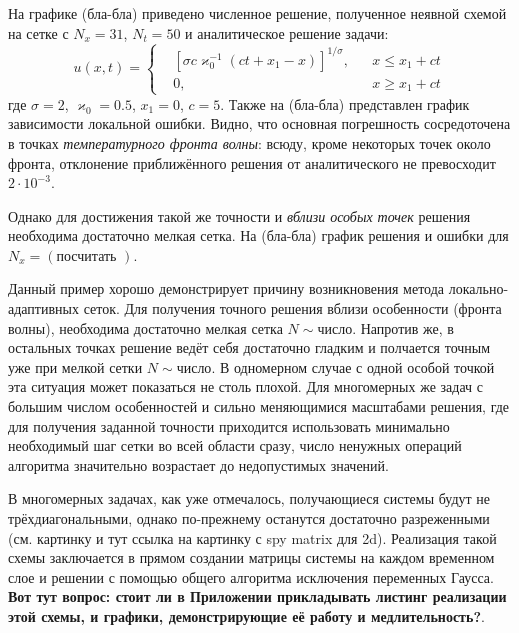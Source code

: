 На графике (бла-бла) приведено численное решение, полученное неявной схемой на сетке с $N_x = 31$, $N_t = 50$ и аналитическое решение задачи:
\begin{equation*}
    u(x, t) = \left\{
        \begin{aligned}
            &\left[ \sigma c\varkappa_0^{-1} (ct + x_1 - x) \right]^{1/\sigma}, && x \le x_1 + ct\\
            &0, && x \ge x_1 + ct
        \end{aligned}
    \right.
\end{equation*}
где $\sigma = 2$, $\varkappa_0 = 0.5$, $x_1 = 0$, $c = 5$. 
Также на (бла-бла) представлен график зависимости локальной ошибки.
Видно, что основная погрешность сосредоточена в точках \emph{температурного фронта волны}: всюду, кроме некоторых точек около фронта, отклонение приближённого решения от аналитического не превосходит $2\cdot 10^{-3}$.

Однако для достижения такой же точности и \emph{вблизи особых точек} решения необходима достаточно мелкая сетка.
На (бла-бла) график решения и ошибки для $N_x = (\text{посчитать    })$.

Данный пример хорошо демонстрирует причину возникновения метода локально-адаптивных сеток.
Для получения точного решения вблизи особенности (фронта волны), необходима достаточно мелкая сетка $N \sim \text{число}$.
Напротив же, в остальных точках решение ведёт себя достаточно гладким и полчается точным уже при мелкой сетки $N \sim \text{число}$.
В одномерном случае с одной особой точкой эта ситуация может показаться не столь плохой.
Для многомерных же задач с большим числом особенностей и сильно меняющимися масштабами решения, где для получения заданной точности приходится использовать минимально необходимый шаг сетки во всей области сразу, число ненужных операций алгоритма значительно возрастает до недопустимых значений. 

В многомерных задачах, как уже отмечалось, получающиеся системы будут не трёхдиагональными, однако по-прежнему останутся достаточно разреженными (см. картинку и тут ссылка на картинку с spy matrix для 2d).
Реализация такой схемы заключается в прямом создании матрицы системы на каждом временном слое и решении с помощью общего алгоритма исключения переменных Гаусса.
\textbf{Вот тут вопрос: стоит ли в Приложении прикладывать листинг реализации этой схемы, и графики, демонстрирующие её работу и медлительность?}.

